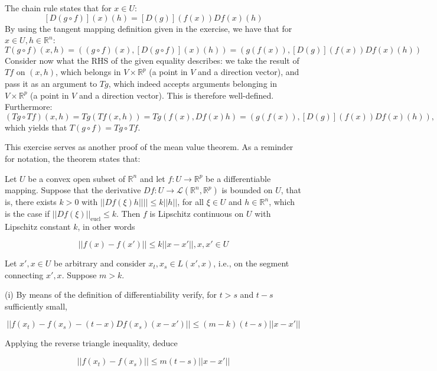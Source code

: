 \begin{solution}

    The chain rule states that for $x \in U$:
    $$[D(g \circ f)](x)(h) = [D(g)](f(x))Df(x)(h)$$
    By using the tangent mapping definition given in the exercise, we have that for $x \in U, h \in \mathbb{R}^n$:
    $$T(g \circ f)(x, h) = ((g \circ f)(x), [D(g \circ f)](x)(h)) = (g(f(x)), [D(g)](f(x))Df(x)(h))$$
    Consider now what the RHS of the given equality describes: we take the result of $Tf$ on $(x, h)$, which belongs in $V \times \mathbb{R}^p$ (a point in $V$ and a direction vector), and pass it as an argument to $Tg$, which indeed accepts arguments belonging in $V \times \mathbb{R}^p$ (a point in $V$ and a direction vector).
    This is therefore well-defined.
    Furthermore:
    $$(Tg \circ Tf)(x, h) = Tg(Tf(x, h)) = Tg(f(x), Df(x)h) = (g(f(x)), [D(g)](f(x))Df(x)(h)),$$
    which yields that $T(g \circ f) = Tg \circ Tf$.
\end{solution}

\begin{exercise}{23}
    This exercise serves as another proof of the mean value theorem.
    As a reminder for notation, the theorem states that:

    Let $U$ be a convex open subset of $\mathbb{R}^n$ and let $f: U \rightarrow \mathbb{R}^p$ be a differentiable mapping.
    Suppose that the derivative $Df: U \rightarrow \mathcal{L}(\mathbb{R}^n, \mathbb{R}^p)$ is bounded on $U$, that is, there exists $k > 0$ with $\lvert \lvert Df(\xi)h \rvert \rvert \rvert \rvert \leq k \lvert \lvert h \rvert \rvert$, for all $\xi \in U$ and $h \in \mathbb{R}^n$, which is the case if $\lvert \lvert Df(\xi) \rvert \rvert_{\text{eucl}} \leq k$.
    Then $f$ is Lipschitz continuous on $U$ with Lipschitz constant $k$, in other words

    $$\lvert \lvert f(x) - f(x') \rvert \rvert \leq k \lvert \lvert x - x' \rvert \rvert, x, x' \in U$$

    Let $x', x \in U$ be arbitrary and consider $x_t, x_s \in L(x', x)$, i.e., on the segment connecting $x', x$.
    Suppose $m > k$.

    (i) By means of the definition of differentiability verify, for $t > s$ and $t - s$ sufficiently small,

    $$\lvert \lvert f(x_t) - f(x_s) - (t - x)Df(x_s)(x - x') \rvert \rvert \leq (m - k)(t - s)\lvert \lvert x - x' \rvert \rvert$$

    Applying the reverse triangle inequality, deduce
    
    $$\lvert \lvert f(x_t) - f(x_s) \rvert \rvert \leq m(t - s)\lvert \lvert x - x' \rvert \rvert$$

\end{exercise}

